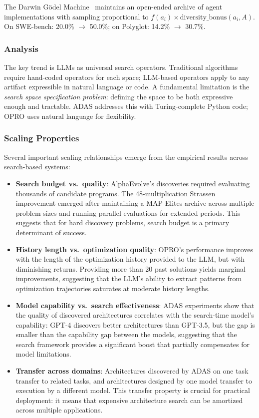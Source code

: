 The Darwin G\"odel Machine~\citep{zhang2025dgm} maintains an open-ended archive of agent implementations with sampling proportional to $f(a_i) \times \text{diversity\_bonus}(a_i, A)$. On SWE-bench: 20.0\% $\rightarrow$ 50.0\%; on Polyglot: 14.2\% $\rightarrow$ 30.7\%.

\subsubsection{Analysis}

The key trend is LLMs as universal search operators. Traditional algorithms require hand-coded operators for each space; LLM-based operators apply to any artifact expressible in natural language or code. A fundamental limitation is the \emph{search space specification problem}: defining the space to be both expressive enough and tractable. ADAS addresses this with Turing-complete Python code; OPRO uses natural language for flexibility.

\subsubsection{Scaling Properties}

Several important scaling relationships emerge from the empirical results across search-based systems:

\begin{itemize}
    \item \textbf{Search budget vs.\ quality}: AlphaEvolve's discoveries required evaluating thousands of candidate programs. The 48-multiplication Strassen improvement emerged after maintaining a MAP-Elites archive across multiple problem sizes and running parallel evaluations for extended periods. This suggests that for hard discovery problems, search budget is a primary determinant of success.

    \item \textbf{History length vs.\ optimization quality}: OPRO's performance improves with the length of the optimization history provided to the LLM, but with diminishing returns. Providing more than 20 past solutions yields marginal improvements, suggesting that the LLM's ability to extract patterns from optimization trajectories saturates at moderate history lengths.

    \item \textbf{Model capability vs.\ search effectiveness}: ADAS experiments show that the quality of discovered architectures correlates with the search-time model's capability: GPT-4 discovers better architectures than GPT-3.5, but the gap is smaller than the capability gap between the models, suggesting that the search framework provides a significant boost that partially compensates for model limitations.

    \item \textbf{Transfer across domains}: Architectures discovered by ADAS on one task transfer to related tasks, and architectures designed by one model transfer to execution by a different model. This transfer property is crucial for practical deployment: it means that expensive architecture search can be amortized across multiple applications.
\end{itemize}

